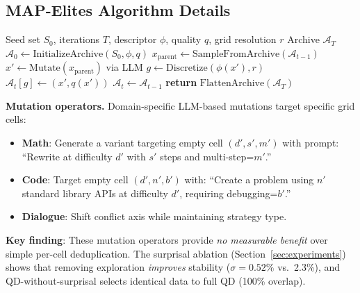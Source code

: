 \documentclass{article}
\begin{document}
\begin{enumerate}[nosep]



\appendix

\section{MAP-Elites Algorithm Details}
\label{sec:app_algorithm}

\begin{algorithm}[h]
\caption{MAP-Elites with mutation operators (full version)}
\label{alg:qd_synth_full}
\begin{algorithmic}[1]
\REQUIRE Seed set $S_0$, iterations $T$, descriptor $\phi$, quality $q$, grid resolution $r$
\ENSURE Archive $\mathcal{A}_T$
\STATE $\mathcal{A}_0 \leftarrow \text{InitializeArchive}(S_0, \phi, q)$
  \STATE $x_{\text{parent}} \leftarrow \text{SampleFromArchive}(\mathcal{A}_{t-1})$
  \STATE $x' \leftarrow \text{Mutate}(x_{\text{parent}})$ via LLM
  \STATE $g \leftarrow \text{Discretize}(\phi(x'), r)$
    \STATE $\mathcal{A}_t[g] \leftarrow (x', q(x'))$
  \ELSE
    \STATE $\mathcal{A}_t \leftarrow \mathcal{A}_{t-1}$
  \ENDIF
\ENDFOR
\STATE \textbf{return} $\text{FlattenArchive}(\mathcal{A}_T)$
\end{algorithmic}
\end{algorithm}

\textbf{Mutation operators.}
Domain-specific LLM-based mutations target specific grid cells:
\begin{itemize}[nosep]
  \item \textbf{Math}: Generate a variant targeting empty cell $(d', s', m')$ with prompt: ``Rewrite at difficulty $d'$ with $s'$ steps and multi-step=$m'$.''
  \item \textbf{Code}: Target empty cell $(d', n', b')$ with: ``Create a problem using $n'$ standard library APIs at difficulty $d'$, requiring debugging=$b'$.''
  \item \textbf{Dialogue}: Shift conflict axis while maintaining strategy type.
\end{itemize}

\noindent\textbf{Key finding}: These mutation operators provide \emph{no measurable benefit} over simple per-cell deduplication. The surprisal ablation (Section~\ref{sec:experiments}) shows that removing exploration \emph{improves} stability ($\sigma{=}0.52\%$ vs.\ 2.3\%), and QD-without-surprisal selects identical data to full QD (100\% overlap).


\end{enumerate}
\end{document}
